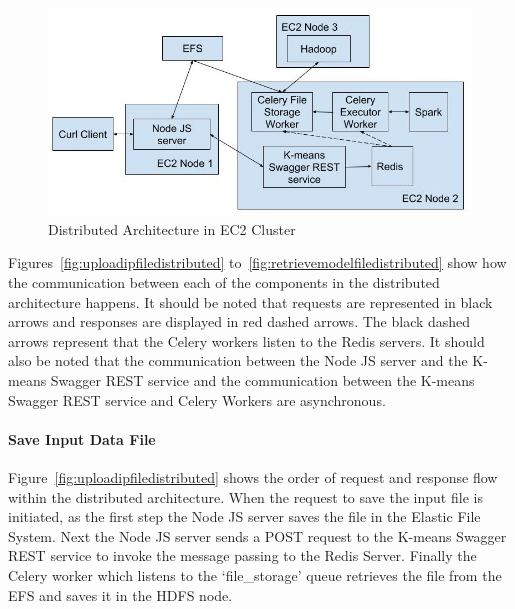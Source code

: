 \begin{figure}[htbp] 
	\centering
	\includegraphics[width=\columnwidth]{images/distributedec2architecture.jpg}
	\caption{Distributed Architecture in EC2 Cluster}
\label{fig:distributedec2architecture} 
\end{figure}

Figures~\ref{fig:uploadipfiledistributed} 
to~\ref{fig:retrievemodelfiledistributed} show how the communication between 
each of the components in the distributed architecture happens. It should be 
noted that requests are represented in black arrows and responses are 
displayed in red dashed arrows. The black dashed arrows represent that the 
Celery workers listen to the Redis servers. It should also be noted that the 
communication between the Node JS server and the K-means Swagger REST 
service and the communication between the K-means Swagger REST service and 
Celery Workers are asynchronous.

\paragraph{Save Input Data File}

Figure~\ref{fig:uploadipfiledistributed} shows the order of request and 
response flow within the distributed architecture. When the request to save 
the input file is initiated, as the first step the Node JS server saves the 
file in the Elastic File System. Next the Node JS server sends a POST request 
to the K-means Swagger REST service to invoke the message passing to the Redis 
Server. Finally the Celery worker which listens to the `file\_storage' queue 
retrieves the file from the EFS and saves it in the HDFS node. 

